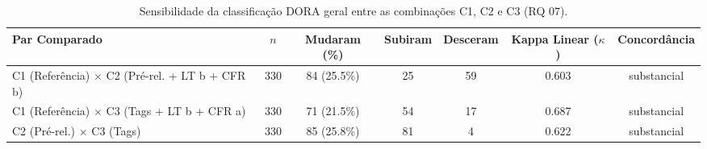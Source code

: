 \begin{table}[ht]
\centering
\caption{Sensibilidade da classificação DORA geral entre as combinações C1, C2 e C3 (RQ 07).}
\label{tab:rq07_sensibilidade}
\small
\begin{tabular}{lcccccc}
\toprule
\textbf{Par Comparado} & \textbf{$n$} & \textbf{Mudaram (\%)} & \textbf{Subiram} & \textbf{Desceram} & \textbf{Kappa Linear ($\kappa$)} & \textbf{Concordância} \\
\midrule
C1 (Referência) $\times$ C2 (Pré-rel. + LT b + CFR b) & 330 & 84 (25.5\%) & 25 & 59 & 0.603 & substancial \\
C1 (Referência) $\times$ C3 (Tags + LT b + CFR a) & 330 & 71 (21.5\%) & 54 & 17 & 0.687 & substancial \\
C2 (Pré-rel.) $\times$ C3 (Tags) & 330 & 85 (25.8\%) & 81 & 4 & 0.622 & substancial \\
\bottomrule
\end{tabular}
\end{table}